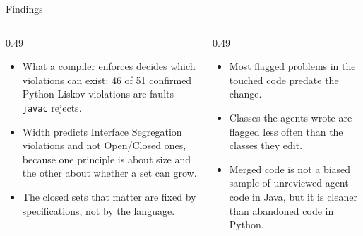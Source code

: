 \documentclass[11pt,aspectratio=169]{beamer}
\begin{document}
\begin{frame}{Findings}
\begin{columns}[T,onlytextwidth]
\begin{column}{0.49\textwidth}
\begin{itemize}\setlength{\itemsep}{4pt}\small
  \item[\textbf{1}] What a compiler enforces decides which violations can exist: 46 of 51 confirmed
        Python Liskov violations are faults \texttt{javac} rejects.
  \item[\textbf{2}] Width predicts Interface Segregation violations and not Open/Closed ones,
        because one principle is about size and the other about whether a set can grow.
  \item[\textbf{3}] The closed sets that matter are fixed by specifications, not by the language.
\end{itemize}
\end{column}
\begin{column}{0.49\textwidth}
\begin{itemize}\setlength{\itemsep}{4pt}\small
  \item[\textbf{4}] Most flagged problems in the touched code predate the change.
  \item[\textbf{5}] Classes the agents wrote are flagged less often than the classes they edit.
  \item[\textbf{6}] Merged code is not a biased sample of unreviewed agent code in Java, but it is
        cleaner than abandoned code in Python.
\end{itemize}
\end{column}
\end{columns}
\end{frame}
\end{document}
